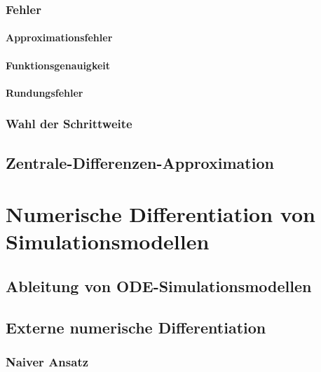 			\subsubsection{Fehler} %

				\paragraph{Approximationsfehler} %

				\paragraph{Funktionsgenauigkeit} %

				\paragraph{Rundungsfehler} %

			\subsubsection{Wahl der Schrittweite} %

		\subsection{Zentrale-Differenzen-Approximation} %

	\section{Numerische Differentiation von Simulationsmodellen} %

		\subsection{Ableitung von ODE-Simulationsmodellen} %

		\subsection{Externe numerische Differentiation} %

			\subsubsection{Naiver Ansatz} %

